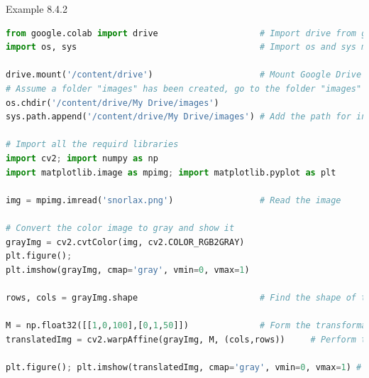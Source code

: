 \documentclass{book}
\begin{document}
\begin{egBox}{Example 8.4.2}{}
    \begin{lstlisting}[language=Python, basicstyle=\ttfamily\small, keywordstyle=\color{blue}, commentstyle=\color{forestgreen}, stringstyle=\color{red}, showstringspaces=false]
from google.colab import drive                    # Import drive from google.colab package
import os, sys                                    # Import os and sys modules

drive.mount('/content/drive')                     # Mount Google Drive
# Assume a folder "images" has been created, go to the folder "images"
os.chdir('/content/drive/My Drive/images')
sys.path.append('/content/drive/My Drive/images') # Add the path for interpreter to search

# Import all the requird libraries
import cv2; import numpy as np
import matplotlib.image as mpimg; import matplotlib.pyplot as plt

img = mpimg.imread('snorlax.png')                 # Read the image

# Convert the color image to gray and show it
grayImg = cv2.cvtColor(img, cv2.COLOR_RGB2GRAY)
plt.figure(); 
plt.imshow(grayImg, cmap='gray', vmin=0, vmax=1)

rows, cols = grayImg.shape                        # Find the shape of the gray image

M = np.float32([[1,0,100],[0,1,50]])              # Form the transformation matrix of translation
translatedImg = cv2.warpAffine(grayImg, M, (cols,rows))     # Perform the transformation

plt.figure(); plt.imshow(translatedImg, cmap='gray', vmin=0, vmax=1) # Show the image


\end{lstlisting}
\end{egBox}
\end{document}
